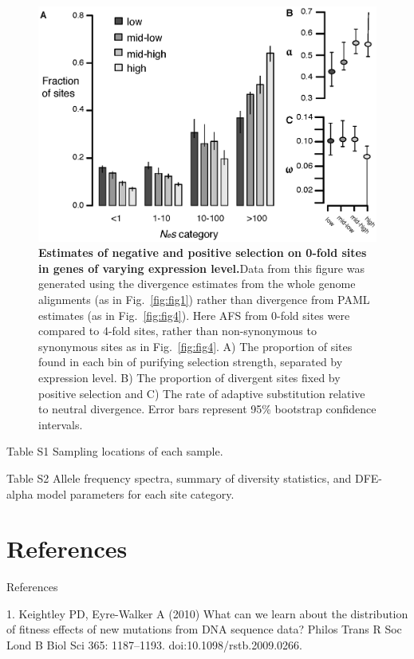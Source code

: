 \begin{figure}[h!]
      \centering
       \includegraphics[width=\linewidth]{Ch2FigS11}
    \caption{\textbf{Estimates of negative and positive selection on 0-fold sites in genes of varying expression level.}Data from this figure was generated using the divergence estimates from the whole genome alignments (as in Fig.~\ref{fig:fig1}) rather than divergence from PAML estimates (as in Fig.~\ref{fig:fig4}). Here AFS from 0-fold sites were compared to 4-fold sites, rather than non-synonymous to synonymous sites as in Fig.~\ref{fig:fig4}. A) The proportion of sites found in each bin of purifying selection strength, separated by expression level. B) The proportion of divergent sites fixed by positive selection and C) The rate of adaptive substitution relative to neutral divergence. Error bars represent 95\% bootstrap confidence intervals.}
    \label{fig:figS11}
\end{figure}

Table S1
Sampling locations of each sample.

Table S2
Allele frequency spectra, summary of diversity statistics, and DFE-alpha model parameters for each site category. 

\section{References}
References

1.	Keightley PD, Eyre-Walker A (2010) What can we learn about the distribution of fitness effects of new mutations from DNA sequence data? Philos Trans R Soc Lond B Biol Sci 365: 1187–1193. doi:10.1098/rstb.2009.0266.

